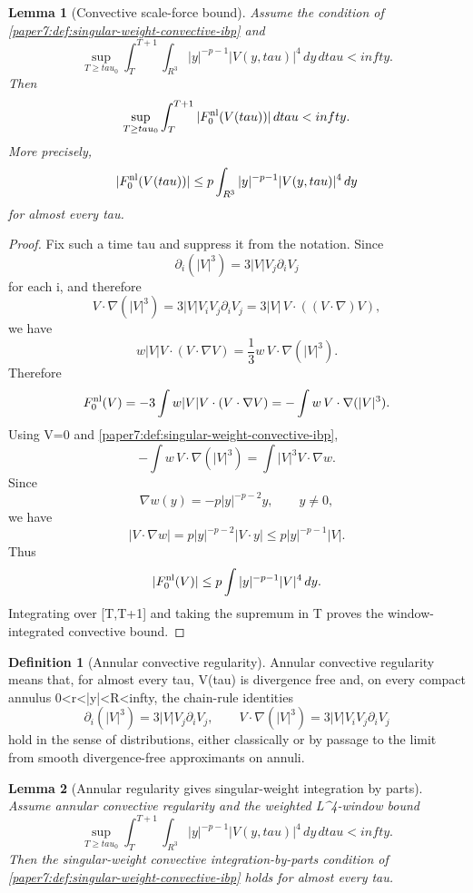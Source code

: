 \documentclass[11pt]{amsart}
\def\({}%
\def\){}%
\def\mathbb#1{#1}%
\def\tau{tau}%
\def\infty{infty}%
\theoremstyle{plain}
\newtheorem{lemma}[lemma]{Lemma}
\theoremstyle{definition}
\newtheorem{definition}[definition]{Definition}
\theoremstyle{remark}
\begin{document}
\begin{lemma}[Convective scale-force bound]
\label{paper7:lem:convective-scale-force}
Assume the condition of \cref{paper7:def:singular-weight-convective-ibp} and
\[
  \sup_{T\ge\tau_0}
  \int_T^{T+1}\int_{\mathbb R^3}
  |y|^{-p-1}|V(y,\tau)|^4\,dy\,d\tau<\infty .
\]
Then
\[
  \sup_{T\ge\tau_0}
  \int_T^{T+1}|F_0^{\rm nl}(V(\tau))|\,d\tau<\infty.
\]
More precisely,
\[
  |F_0^{\rm nl}(V(\tau))|
  \le
  p\int_{\mathbb R^3}|y|^{-p-1}|V(y,\tau)|^4\,dy
\]
for almost every \(\tau\).
\end{lemma}

\begin{proof}
Fix such a time \(\tau\) and suppress it from the notation.  Since
\[
  \partial_i(|V|^3)=3|V|V_j\partial_iV_j
\]
for each \(i\), and therefore
\[
  V\cdot\nabla(|V|^3)
  =
  3|V|V_iV_j\partial_iV_j
  =
  3|V|\,V\cdot((V\cdot\nabla)V),
\]
we have
\[
  w|V|V\cdot(V\cdot\nabla V)
  =
  \frac13 w\,V\cdot\nabla(|V|^3).
\]
Therefore
\[
  F_0^{\rm nl}(V)
  =
  -3\int w|V|V\cdot(V\cdot\nabla V)
  =
  -\int w\,V\cdot\nabla(|V|^3).
\]
Using \(\nabla\cdot V=0\) and
\cref{paper7:def:singular-weight-convective-ibp},
\[
  -\int w\,V\cdot\nabla(|V|^3)
  =
  \int |V|^3V\cdot\nabla w.
\]
Since
\[
  \nabla w(y)=-p|y|^{-p-2}y,\qquad y\ne0,
\]
we have
\[
  |V\cdot\nabla w|
  =
  p|y|^{-p-2}|V\cdot y|
  \le p|y|^{-p-1}|V|.
\]
Thus
\[
  |F_0^{\rm nl}(V)|
  \le
  p\int |y|^{-p-1}|V|^4\,dy.
\]
Integrating over \([T,T+1]\) and taking the supremum in \(T\) proves the
window-integrated convective bound.
\end{proof}

\begin{definition}[Annular convective regularity]
\label{paper7:def:annular-convective-regularity}
Annular convective regularity means that, for almost every \(\tau\),
\(V(\tau)\) is divergence free and, on every compact annulus
\(0<r<|y|<R<\infty\), the chain-rule identities
\[
  \partial_i(|V|^3)=3|V|V_j\partial_iV_j,
  \qquad
  V\cdot\nabla(|V|^3)=3|V|V_iV_j\partial_iV_j
\]
hold in the sense of distributions, either classically or by passage to the
limit from smooth divergence-free approximants on annuli.
\end{definition}

\begin{lemma}[Annular regularity gives singular-weight integration by parts]
\label{paper7:lem:annular-regularity-ibp}
Assume annular convective regularity and the weighted \(L^4\)-window bound
\[
  \sup_{T\ge\tau_0}
  \int_T^{T+1}\int_{\mathbb R^3}
  |y|^{-p-1}|V(y,\tau)|^4\,dy\,d\tau<\infty.
\]
Then the singular-weight convective integration-by-parts condition of
\cref{paper7:def:singular-weight-convective-ibp} holds for almost every \(\tau\).
\end{lemma}
\end{document}
